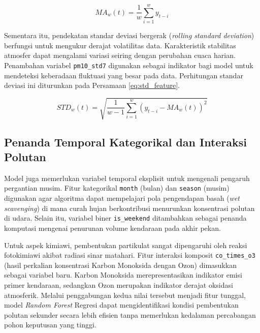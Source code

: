 \begin{equation}
MA_w(t) = \frac{1}{w} \sum_{i=1}^{w} y_{t-i}
\label{eq:ma_feature}
\end{equation}

Sementara itu, pendekatan standar deviasi bergerak (\textit{rolling standard deviation}) berfungsi untuk mengukur derajat volatilitas data. Karakteristik stabilitas atmosfer dapat mengalami variasi seiring dengan perubahan cuaca harian. Penambahan variabel \texttt{pm10\_std7} digunakan sebagai indikator bagi model untuk mendeteksi keberadaan fluktuasi yang besar pada data. Perhitungan standar deviasi ini diturunkan pada Persamaan \ref{eq:std_feature}.

\begin{equation}
STD_w(t) = \sqrt{\frac{1}{w-1} \sum_{i=1}^{w} \left( y_{t-i} - MA_w(t) \right)^2}
\label{eq:std_feature}
\end{equation}

\newpage

\raggedbottom

\subsection{Penanda Temporal Kategorikal dan Interaksi Polutan}

Model juga memerlukan variabel temporal eksplisit untuk mengenali pengaruh pergantian musim. Fitur kategorikal \texttt{month} (bulan) dan \texttt{season} (musim) digunakan agar algoritma dapat mempelajari pola pengendapan basah (\textit{wet scavenging}) di mana curah hujan berkontribusi menurunkan konsentrasi polutan di udara. Selain itu, variabel biner \texttt{is\_weekend} ditambahkan sebagai penanda komputasi mengenai penurunan volume kendaraan pada akhir pekan.

Untuk aspek kimiawi, pembentukan partikulat sangat dipengaruhi oleh reaksi fotokimiawi akibat radiasi sinar matahari. Fitur interaksi komposit \texttt{co\_times\_o3} (hasil perkalian konsentrasi Karbon Monoksida dengan Ozon) dimasukkan sebagai variabel baru. Karbon Monoksida merepresentasikan indikator emisi primer kendaraan, sedangkan Ozon merupakan indikator derajat oksidasi atmosferik. Melalui penggabungan kedua nilai tersebut menjadi fitur tunggal, model \textit{Random Forest} Regresi dapat mengidentifikasi kondisi pembentukan polutan sekunder secara lebih efisien tanpa memerlukan kedalaman percabangan pohon keputusan yang tinggi.

